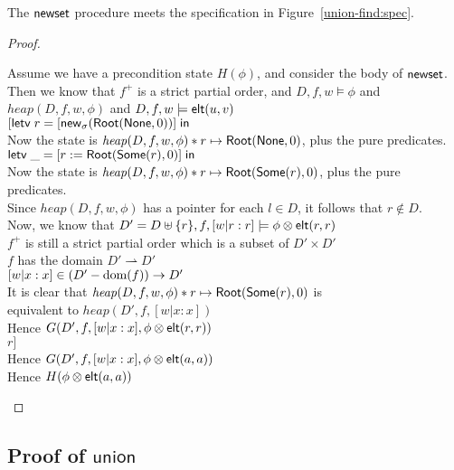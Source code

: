 \begin{lemma}
The $\mathsf{newset}$ procedure meets the specification in Figure~\ref{union-find:spec}. 
\end{lemma}

\begin{proof}
\begin{tabbedproof}
\oo Assume we have a precondition state $H(\phi)$, and consider the body of $\mathsf{newset}$. \\
\ooo Then we know that $f^+$ is a strict partial order, and $D,f,w \models \phi$ and \\
\oox $\mathit{heap}(D,f,w,\phi)$ and $D,f,w \models \mathsf{elt}({u}, {v})$ \\
\ooo $[\mathsf{letv}\;r = [\mathsf{new}_{\sigma}(\mathsf{Root}(\mathsf{None}, 0))]\;\mathsf{in}\;$ \\
\ooo Now the state is $\mathit{heap}(D,f,w,\phi) * r \mapsto \mathsf{Root}(\mathsf{None}, 0)$, plus the pure predicates. \\
\ooo $\mathsf{letv}\;\_ = [r := \mathsf{Root}(\mathsf{Some}(r), 0)]\;\mathsf{in}\;$ \\
\ooo Now the state is $\mathit{heap}(D,f,w,\phi) * r \mapsto \mathsf{Root}(\mathsf{Some}(r), 0)$, plus the pure predicates. \\
\ooo Since $\mathit{heap}(D,f,w,\phi)$ has a pointer for each $l \in D$, it follows that $r \not \in D$. \\
\ooo Now, we know that $D' = D \uplus \{{r}\}, f, [w|r:r] \models \phi \otimes \mathsf{elt}({r}, {r})$ \\ 
\ooo $f^+$ is still a strict partial order which is a subset of $D' \times D'$ \\
\ooo $f$ has the domain $D' \rightharpoonup D'$ \\
\ooo $[w|x:x] \in (D' - \mbox{dom}({f})) \to D'$ \\
\ooo It is clear that $\mathit{heap}(D,f,w,\phi) * r \mapsto \mathsf{Root}(\mathsf{Some}(r), 0)$ is \\
\oox equivalent to $\mathit{heap}(D', f, [w|x:x])$ \\
\ooo Hence $G(D', f, [w|x:x], \phi \otimes \mathsf{elt}({r}, {r}))$ \\
\ooo $r]$ \\
\ooo Hence $G(D', f, [w|x:x], \phi \otimes \mathsf{elt}({a}, {a}))$ \\
\ooo Hence $H(\phi \otimes \mathsf{elt}({a}, {a}))$ 
\end{tabbedproof}
\end{proof}

\subsection{Proof of $\mathsf{union}$}

